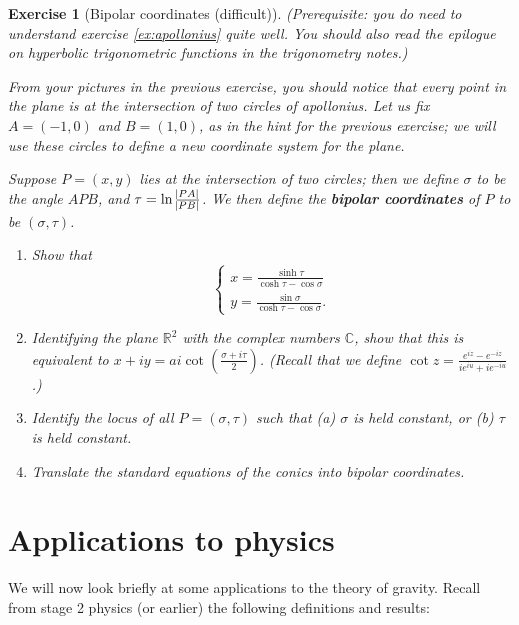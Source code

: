 \documentclass[a4paper,leqno,9pt]{article}
\theoremstyle{exercise}
\newtheorem{Exercise}{Exercise}
\newenvironment{exercise}
  {\begin{mdframed}\begin{Exercise}}
  {\end{Exercise}\end{mdframed}}
\theoremstyle{plain}
\theoremstyle{definition}
\theoremstyle{remark}
\newcommand{\df}{\textbf}
\begin{document}
\begin{exercise}[Bipolar coordinates (difficult)]
  (Prerequisite: you do need to understand exercise \ref{ex:apollonius} quite well. You should also read the epilogue on hyperbolic trigonometric
  functions in the trigonometry notes.)

  From your pictures in the previous exercise, you should notice that every point in the plane is at the intersection of two circles of apollonius.
  Let us fix $ A = (-1, 0) $ and $ B = (1,0) $, as in the hint for the previous exercise; we will use these circles to define a new coordinate system
  for the plane.

  Suppose $ P = (x,y) $ lies at the intersection of two circles; then we define $ \sigma $ to be the angle $ APB $, and $ \tau = \ln \frac{\abs{PA}}{\abs{PB}} $.
  We then define the \df{bipolar coordinates} of $ P $ to be $ (\sigma, \tau) $.
  \begin{enumerate}
    \item Show that
          \begin{displaymath}
            \begin{cases}
              x = \frac{\sinh \tau}{\cosh \tau - \cos \sigma}\\
              y = \frac{\sin \sigma}{\cosh \tau - \cos \sigma}.
            \end{cases}
          \end{displaymath}
    \item Identifying the plane $ \mathbb{R}^2 $ with the complex numbers $ \mathbb{C} $, show that this is
          equivalent to $ x + iy = ai \cot \left(\frac{\sigma + i\tau}{2}\right) $. (Recall that we define $ \cot z = \frac{e^{iz} - e^{-iz}}{ie^{iu} + ie^{-iu}} $.)
    \item Identify the locus of all $ P = (\sigma, \tau) $ such that (a) $ \sigma $ is held constant, or (b) $ \tau $ is held constant.
    \item Translate the standard equations of the conics into bipolar coordinates.
  \end{enumerate}
\end{exercise}

\section{Applications to physics}
We will now look briefly at some applications to the theory of gravity. Recall from stage 2 physics (or earlier)
the following definitions and results:
\end{document}
